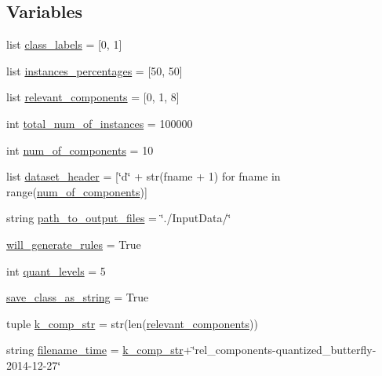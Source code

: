 \subsection*{Variables}
\begin{DoxyCompactItemize}
\item 
list \hyperlink{namespacedata__generation_ab52d553b1eb5f4c6d065e0435753addc}{class\+\_\+labels} = \mbox{[}0, 1\mbox{]}
\item 
list \hyperlink{namespacedata__generation_a1c4e107080b11e6ef67edd30bfb93b05}{instances\+\_\+percentages} = \mbox{[}50, 50\mbox{]}
\item 
list \hyperlink{namespacedata__generation_afa9b1b91a7860372739bca028f41263b}{relevant\+\_\+components} = \mbox{[}0, 1, 8\mbox{]}
\item 
int \hyperlink{namespacedata__generation_a963ce4f506a2b3bb6acb94915445f716}{total\+\_\+num\+\_\+of\+\_\+instances} = 100000
\item 
int \hyperlink{namespacedata__generation_ad68308d6e9bf4bd2485a44ce0c52315c}{num\+\_\+of\+\_\+components} = 10
\item 
list \hyperlink{namespacedata__generation_a345ef2cc135025dccbfbba8502ba6d8d}{dataset\+\_\+header} = \mbox{[}\char`\"{}d\char`\"{} + str(fname + 1) for fname in range(\hyperlink{namespacedata__generation_ad68308d6e9bf4bd2485a44ce0c52315c}{num\+\_\+of\+\_\+components})\mbox{]}
\item 
string \hyperlink{namespacedata__generation_ad7ee72f39a9a602967e77e4da382566a}{path\+\_\+to\+\_\+output\+\_\+files} = \char`\"{}./Input\+Data/\char`\"{}
\item 
\hyperlink{namespacedata__generation_abf6964c9992abb3c8c479fa568833f1c}{will\+\_\+generate\+\_\+rules} = True
\item 
int \hyperlink{namespacedata__generation_adf1cda3bf67a0646998d7ad03f8d1337}{quant\+\_\+levels} = 5
\item 
\hyperlink{namespacedata__generation_ae8c6a78af0481f316865220c829b86d2}{save\+\_\+class\+\_\+as\+\_\+string} = True
\item 
tuple \hyperlink{namespacedata__generation_a0750f715835d704f388842c370b48499}{k\+\_\+comp\+\_\+str} = str(len(\hyperlink{namespacedata__generation_afa9b1b91a7860372739bca028f41263b}{relevant\+\_\+components}))
\item 
string \hyperlink{namespacedata__generation_ad5e85da3fcf335e51b7dacc9404e221b}{filename\+\_\+time} = \hyperlink{namespacedata__generation_a0750f715835d704f388842c370b48499}{k\+\_\+comp\+\_\+str}+\char`\"{}rel\+\_\+components-\/quantized\+\_\+butterfly-\/2014-\/12-\/27\char`\"{}

\end{DoxyCompactItemize}

